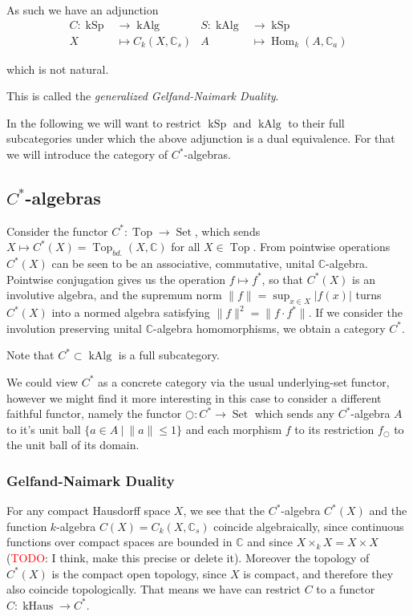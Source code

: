 \documentclass[12pt,a4paper]{article}
\DeclareMathOperator{\Hom}{Hom}
\DeclareMathOperator{\Set}{Set}
\DeclareMathOperator{\Top}{Top}
\DeclareMathOperator{\kSp}{kSp}
\DeclareMathOperator{\kHaus}{kHaus}
\DeclareMathOperator{\kAlg}{kAlg}
\begin{document}
As such we have an adjunction 
\begin{align*}
	C: \kSp & \to \kAlg &  S: \kAlg & \to \kSp\\
	X &\mapsto C_k(X, \mathbb{C}_s) & A &\mapsto \Hom_k(A, \mathbb{C}_a)
\end{align*}

which is not natural.

This is called the \emph{generalized Gelfand-Naimark Duality}. 

In the following we will want to restrict $\kSp$ and $\kAlg$ to their full subcategories under which the above adjunction is a dual equivalence. For that we will introduce the category of $C^*$-algebras.
\subsection{$C^*$-algebras}
Consider the functor $C^*: \Top \to \Set$, which sends  $X \mapsto C^*(X) = \Top_{bd.}(X, \mathbb{C})$ for all $X \in \Top$. 
From pointwise operations $C^*(X)$ can be seen to be an associative, commutative, unital $\mathbb{C}$-algebra. Pointwise conjugation gives us the operation $f \mapsto f^*$, so that $C^*(X)$ is an involutive algebra, and the supremum norm $\lVert f \lVert = \sup_{x \in X}\lvert f(x)\lvert $ turns $C^*(X)$ into a normed algebra satisfying $\lVert f \lVert^2 = \lVert f \cdot f^* \lVert$. If we consider the involution preserving unital $\mathbb{C}$-algebra homomorphisms, we obtain a category $C^*$.

Note that $C^* \subset \kAlg$ is a full subcategory.

 We could view $C^*$ as a concrete category via the usual underlying-set functor, however we might find it more interesting in this case to consider a different faithful functor, namely the functor $\bigcirc: C^* \to \Set$ which sends any $C^*$-algebra $A$ to it's unit ball $\{ a \in A \  \lvert  \ \lVert a \lVert \leq 1\}$ and each morphism $f$  to its restriction $f_\bigcirc$ to the unit ball of its domain.
 
 \subsubsection{Gelfand-Naimark Duality}
 
 For any compact Hausdorff space $X$, we see that the $C^*$-algebra $C^*(X)$ and the function $k$-algebra $C(X) = C_k(X, \mathbb{C}_s)$ coincide algebraically, since continuous functions over compact spaces are bounded in $\mathbb{C}$ and since $X \times_k X = X \times X$ (\textcolor{red}{TODO}: I think, make this precise or delete it). Moreover the topology of $C^*(X)$ is the compact open topology, since $X$ is compact, and therefore they also coincide topologically. That means we have can restrict $C$ to a functor $C: \kHaus \to C^*$.
 
\end{document}
